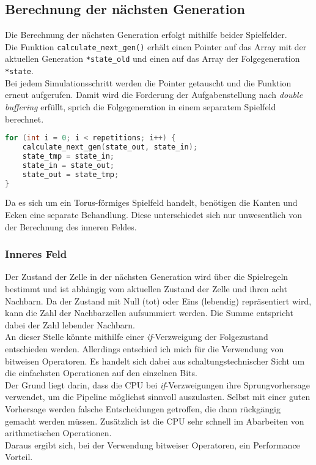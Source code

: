 \documentclass[german,plainarticle,hyperref,utf8]{zihpub}
\begin{document}
	\subsection{Berechnung der nächsten Generation}
	Die Berechnung der nächsten Generation erfolgt mithilfe beider Spielfelder.\\ Die Funktion \texttt{calculate\_next\_gen()} erhält einen Pointer auf das Array mit der aktuellen Generation \texttt{*state\_old} und einen auf das Array der Folgegeneration \texttt{*state}.\\
	Bei jedem Simulationsschritt werden die Pointer getauscht und die Funktion erneut aufgerufen. Damit wird die Forderung der Aufgabenstellung nach \textit{double buffering} erfüllt, sprich die Folgegeneration in einem separatem Spielfeld berechnet.
	\begin{lstlisting}[language=C, caption=Vertauschen der Pointer vor jedem Funktionsaufruf (vereinfacht)]
for (int i = 0; i < repetitions; i++) {
	calculate_next_gen(state_out, state_in);
	state_tmp = state_in;
	state_in = state_out;
	state_out = state_tmp;
}\end{lstlisting}
	Da es sich um ein Torus-förmiges Spielfeld handelt, benötigen die Kanten und Ecken eine separate Behandlung. Diese unterschiedet sich nur unwesentlich von der Berechnung des inneren Feldes.
	\newpage
	\subsubsection{Inneres Feld}
	Der Zustand der Zelle in der nächsten Generation wird über die Spielregeln bestimmt und ist abhängig vom aktuellen Zustand der Zelle und ihren acht Nachbarn. Da der Zustand mit Null (tot) oder Eins (lebendig) repräsentiert wird, kann die Zahl der Nachbarzellen aufsummiert werden. Die Summe entspricht dabei der Zahl lebender Nachbarn.\\
	An dieser Stelle könnte mithilfe einer \textit{if}-Verzweigung der Folgezustand entschieden werden. Allerdings entschied ich mich für die Verwendung von bitweisen Operatoren. Es handelt sich dabei aus schaltungstechnischer Sicht um die einfachsten Operationen auf den einzelnen Bits.\\
	Der Grund liegt darin, dass die CPU bei \textit{if}-Verzweigungen ihre Sprungvorhersage verwendet, um die Pipeline möglichst sinnvoll auszulasten. Selbst mit einer guten Vorhersage werden falsche Entscheidungen getroffen, die dann rückgängig gemacht werden müssen. Zusätzlich ist die CPU sehr schnell im Abarbeiten von arithmetischen Operationen.\\
	Daraus ergibt sich, bei der Verwendung bitweiser Operatoren, ein Performance Vorteil.\\
	
\end{document}
